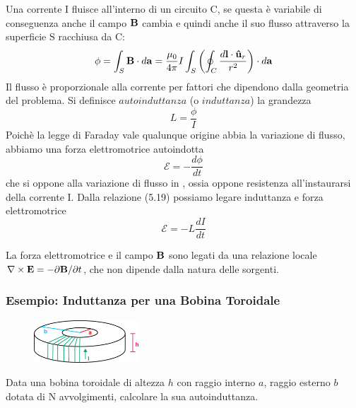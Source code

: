 Una corrente I fluisce all'interno di un circuito C, se questa \`e variabile di conseguenza anche il campo $\bold{B}$ cambia e quindi anche il suo flusso attraverso la superficie S racchiusa da C:
\begin{equation*}
	\phi = \int_{S} \bold{B} \cdot d \bold{a} = \frac{\mu_0}{4 \pi}I \int_{S}\left(\oint_{C} \frac{d \bold{l} \cdot \bold{\hat{u}}_{r}}{r^2}\right) \cdot d \bold{a}
\end{equation*}
Il flusso \`e proporzionale alla corrente per fattori che dipendono dalla geometria del problema.  Si definisce $autoinduttanza$ (o $induttanza$) la grandezza 
\begin{equation}
	L = \frac{\phi}{I}
\end{equation} 
Poich\`e la legge di Faraday vale qualunque origine abbia la variazione di flusso, abbiamo una forza elettromotrice autoindotta
\begin{equation*}
	\mathcal{E} = - \frac{d\phi}{dt}
\end{equation*}
che si oppone alla variazione di flusso in , ossia oppone resistenza all'instaurarsi della corrente I. Dalla relazione (5.19) possiamo legare induttanza e forza elettromotrice 
\begin{equation}
	\mathcal{E} = - L \frac{dI}{dt}
\end{equation}

\begin{remark}
	La forza elettromotrice e il campo $\bold{B}$ sono legati da una relazione locale $\nabla \times \bold{E} = - \partial \bold{B}/\partial t$, che non dipende dalla natura delle sorgenti.
\end{remark}

\subsubsection{Esempio: Induttanza per una Bobina Toroidale}
\begin{figure} %
    \vspace{-0.7cm}
    \centering
    \includegraphics[width=0.35\textwidth]{images/toroid} %
\end{figure}
Data una bobina toroidale di altezza $h$ con raggio interno $a$, raggio esterno $b$ dotata di N avvolgimenti, calcolare la sua autoinduttanza.

